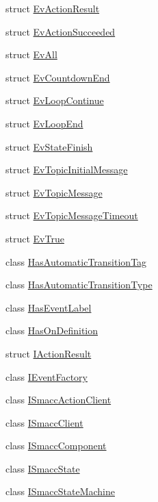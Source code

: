 \begin{DoxyCompactItemize}
\item 
struct \hyperlink{structsmacc_1_1EvActionResult}{Ev\+Action\+Result}
\item 
struct \hyperlink{structsmacc_1_1EvActionSucceeded}{Ev\+Action\+Succeeded}
\item 
struct \hyperlink{structsmacc_1_1EvAll}{Ev\+All}
\item 
struct \hyperlink{structsmacc_1_1EvCountdownEnd}{Ev\+Countdown\+End}
\item 
struct \hyperlink{structsmacc_1_1EvLoopContinue}{Ev\+Loop\+Continue}
\item 
struct \hyperlink{structsmacc_1_1EvLoopEnd}{Ev\+Loop\+End}
\item 
struct \hyperlink{structsmacc_1_1EvStateFinish}{Ev\+State\+Finish}
\item 
struct \hyperlink{structsmacc_1_1EvTopicInitialMessage}{Ev\+Topic\+Initial\+Message}
\item 
struct \hyperlink{structsmacc_1_1EvTopicMessage}{Ev\+Topic\+Message}
\item 
struct \hyperlink{structsmacc_1_1EvTopicMessageTimeout}{Ev\+Topic\+Message\+Timeout}
\item 
struct \hyperlink{structsmacc_1_1EvTrue}{Ev\+True}
\item 
class \hyperlink{classsmacc_1_1HasAutomaticTransitionTag}{Has\+Automatic\+Transition\+Tag}
\item 
class \hyperlink{classsmacc_1_1HasAutomaticTransitionType}{Has\+Automatic\+Transition\+Type}
\item 
class \hyperlink{classsmacc_1_1HasEventLabel}{Has\+Event\+Label}
\item 
class \hyperlink{classsmacc_1_1HasOnDefinition}{Has\+On\+Definition}
\item 
struct \hyperlink{structsmacc_1_1IActionResult}{I\+Action\+Result}
\item 
class \hyperlink{classsmacc_1_1IEventFactory}{I\+Event\+Factory}
\item 
class \hyperlink{classsmacc_1_1ISmaccActionClient}{I\+Smacc\+Action\+Client}
\item 
class \hyperlink{classsmacc_1_1ISmaccClient}{I\+Smacc\+Client}
\item 
class \hyperlink{classsmacc_1_1ISmaccComponent}{I\+Smacc\+Component}
\item 
class \hyperlink{classsmacc_1_1ISmaccState}{I\+Smacc\+State}
\item 
class \hyperlink{classsmacc_1_1ISmaccStateMachine}{I\+Smacc\+State\+Machine}
\item 

\end{DoxyCompactItemize}
